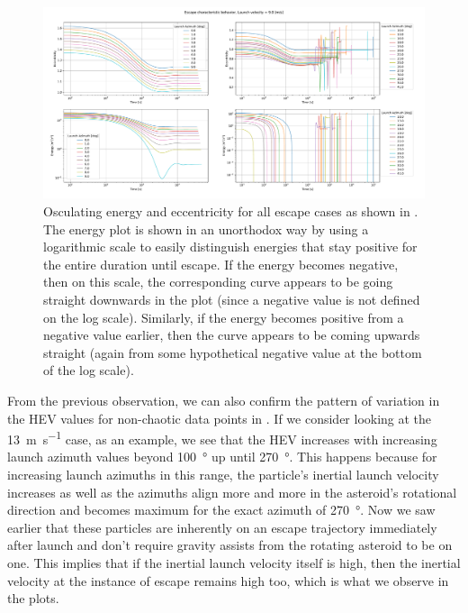 \FloatBarrier
\begin{figure}[htb]
\centering
\captionsetup{justification=centering}
\includegraphics[angle=90, width=\textwidth, height=\textheight, keepaspectratio=true]{Images/longest_edge_no_perturbations/escape_energy_ecc_9ms.pdf}
\caption{Osculating energy and eccentricity for all escape cases as shown in \protect{}. The energy plot is shown in an unorthodox way by using a logarithmic scale to easily distinguish energies that stay positive for the entire duration until escape. If the energy becomes negative, then on this scale, the corresponding curve appears to be going straight downwards in the plot (since a negative value is not defined on the log scale). Similarly, if the energy becomes positive from a negative value earlier, then the curve appears to be coming upwards straight (again from some hypothetical negative value at the bottom of the log scale).}
\label{fig:energy_ecc_escape_9ms_noSP}
\end{figure}
\FloatBarrier
From the previous observation, we can also confirm the pattern of variation in the \gls{HEV} values for non-chaotic data points in . If we consider looking at the \SI{13}{\metre\per\second} case, as an example, we see that the \gls{HEV} increases with increasing launch azimuth values beyond \SI{100}{\degree} up until \SI{270}{\degree}. This happens because for increasing launch azimuths in this range, the particle's inertial launch velocity increases as well as the azimuths align more and more in the asteroid's rotational direction and becomes maximum for the exact azimuth of \SI{270}{\degree}. Now we saw earlier that these particles are inherently on an escape trajectory immediately after launch and don't require gravity assists from the rotating asteroid to be on one. This implies that if the inertial launch velocity itself is high, then the inertial velocity at the instance of escape remains high too, which is what we observe in the plots.

